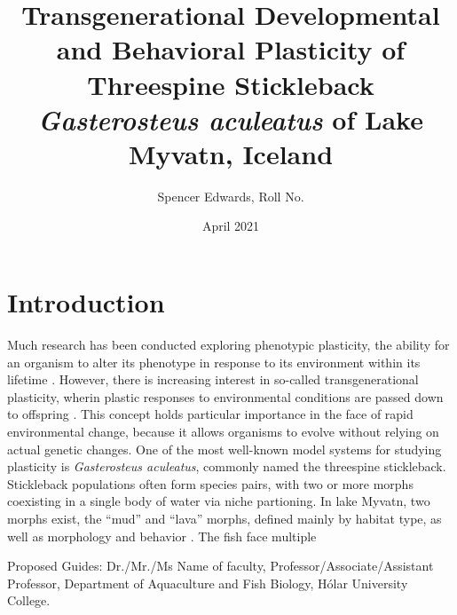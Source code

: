 \documentclass[12pt]{extarticle}
\title{Transgenerational Developmental and Behavioral Plasticity of Threespine Stickleback \textit{Gasterosteus aculeatus} of Lake Myvatn, Iceland}
\author{Spencer Edwards, Roll No.}
\date{April 2021}
\begin{document}
\maketitle

\section*{Introduction}
Much research has been conducted exploring phenotypic plasticity, the ability for an organism to alter its phenotype in response to its environment within its lifetime \citep{Denver2010, Kishida2010, Klemetsen2010}. However, there is increasing interest in so-called transgenerational plasticity, wherin plastic responses to environmental conditions are passed down to offspring \citep{Hellmann2020, Richter-Boix2014, Bell2019, Shama2014}. This concept holds particular importance in the face of rapid environmental change, because it allows organisms to evolve without relying on actual genetic changes. One of the most well-known model systems for studying plasticity is \textit{Gasterosteus aculeatus}, commonly named the threespine stickleback. Stickleback populations often form species pairs, with two or more morphs coexisting in a single body of water via niche partioning. In lake Myvatn, two morphs exist, the ``mud'' and ``lava'' morphs, defined mainly by habitat type, as well as morphology and behavior \citep{Kristjansson2002, Millet2013}. The fish face multiple  

Proposed Guides: Dr./Mr./Ms Name of faculty, Professor/Associate/Assistant Professor, Department of Aquaculture and Fish Biology, H\'olar University College.

\end{document}
